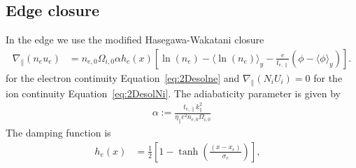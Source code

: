 \subsection{Edge closure}\label{sec:edgeclosure}
In the edge we use the modified Hasegawa-Wakatani closure 
\begin{align}\label{eq:modhw}
\nabla_\parallel \left(n_e u_e\right) &= n_{e,0} \Omega_{i,0} \alpha  h_{e}(x)
\left[ \ln (n_e) - \langle  \ln (n_e)\rangle_y  - \frac{e}{t_{e,\parallel}} \left(\phi - \langle \phi\rangle_y\right)
\right].
\end{align}
for the electron continuity Equation~\eqref{eq:2Desolne} and \(\nabla_\parallel \left(N_i U_i\right) = 0\) for the ion continuity Equation~\eqref{eq:2DesolNi}.
The adiabaticity parameter is given by 
\begin{align}
 \alpha:= \frac{ t_{e,\parallel}  k_\parallel^2 }{ \eta_\parallel e^2   n_{e,0} \Omega_{i,0} }
\end{align}
The damping function is 
\begin{align}
 h_{e}(x) &=\frac{1}{2}\left[1- \tanh{\left(\frac{(x-x_e)}{\sigma_e}\right)}\right], & 
\end{align}

